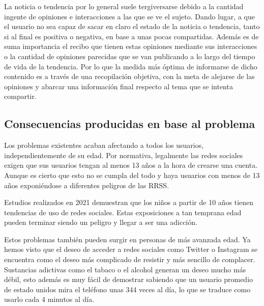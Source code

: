\vspace{0.3cm}

La noticia o tendencia por lo general suele tergiversarse debido a la cantidad ingente de opiniones e interacciones a las que se ve el sujeto. Dando lugar, a que el usuario no sea capaz de sacar en claro el estado de la noticia o tendencia, tanto si al final es positiva o negativa, en base a unas pocas compartidas. Además es de suma importancia el recibo que tienen estas opiniones mediante sus interacciones o la cantidad de opiniones parecidas que se van publicando a lo largo del tiempo de vida de la tendencia. Por lo que la medida más óptima de informarse de dicho contenido es a través de una recopilación objetiva, con la meta de alejarse de las opiniones y abarcar una información final respecto al tema que se intenta compartir.

\subsection{Consecuencias producidas en base al problema}\label{sec:consec_problm}

Los problemas existentes acaban afectando a todos los usuarios, independientemente de su edad. Por normativa, legalmente las redes sociales exigen que sus usuarios tengan al menos 13 años a la hora de crearse una cuenta. Aunque es cierto que esto no se cumpla del todo y haya usuarios con menos de 13 años exponiéndose a diferentes peligros de las \acs{RRSS}.

\vspace{0.3cm}

Estudios realizados en 2021 demuestran que los niños a partir de 10 años tienen tendencias de uso de redes sociales. Estas exposiciones a tan temprana edad pueden terminar siendo un peligro y llegar a ser una adicción.  \cite{Adiccion-RRSS}

\vspace{0.3cm}

Estos problemas también pueden surgir en personas de más avanzada edad. Ya hemos visto que el deseo de acceder a redes sociales como Twitter o Instagram se encuentra como el deseo más complicado de resistir y más sencillo de complacer. Sustancias adictivas como el tabaco o el alcohol generan un deseo mucho más débil, esto además es muy fácil de demostrar sabiendo que un usuario promedio de estado unidos mira el teléfono unas 344 veces al día, lo que se traduce como usarlo cada 4 minutos al día. \cite{Reviews-RRSS-AS}


